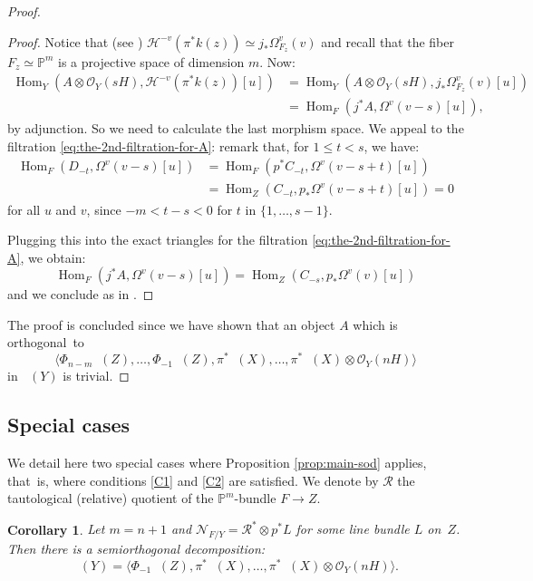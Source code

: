 \documentclass[JEP,XML,SOM,Unicode,NoEqCountersInSection]{cedram}
\let\mathcal\mathscr
\theoremstyle{plain}
\newtheorem{cor}[theorem]{Corollary}
\theoremstyle{definition}
\newcommand{\cat}[1]{\mathsf{#1}}
\newcommand{\sod}[1]{\langle #1 \rangle}
\DeclareMathOperator{\Db}{{\cat{D}^{\mathrm{b}}}}
\DeclareMathOperator{\Hom}{Hom}
\newcommand{\PP}{\mathbb{P}}
\newcommand{\sheaf}[1]{\mathcal{#1}}
\newcommand{\kh}{\sheaf{H}}
\newcommand{\kn}{\sheaf{N}}
\newcommand{\ko}{\sheaf{O}}\let\OO\ko\let\cO\ko
\newcommand{\kr}{\sheaf{R}}
\begin{document}
\begin{proof}
\begin{proof}
Notice that (see \eg \cite[Prop.\,11.12]{Huybook}) $\kh^{-v}( \pi^* k(z)) \simeq j_*\Omega_{F_z}^v(v)$ and recall that the fiber
$F_z \simeq \PP^m$ is a projective space of dimension $m$. Now:\vspace*{-3pt}
\begin{align*}
\Hom_Y(A \otimes \ko_Y(sH),\kh^{-v}( \pi^* k(z))[u]) & = \Hom_Y(A \otimes \ko_Y(sH),j_*\Omega_{F_z}^v(v)[u])\\
& = \Hom_F(j^* A, \Omega^v(v-s)[u]),
\end{align*}
by adjunction. So we need to calculate the last morphism space. We appeal to the filtration \eqref{eq:the-2nd-filtration-for-A}:
remark that, for $1 \leq t < s$, we have:\vspace*{-3pt}
\begin{align*}
\Hom_F(D_{-t}, \Omega^v(v-s)[u]) & = \Hom_F(p^* C_{-t}, \Omega^v(v-s+t)[u]) \\
& = \Hom_Z(C_{-t}, p_*\Omega^v(v-s+t)[u])=0
\end{align*}
for all $u$ and $v$, since $-m < t-s < 0$ for $t$ in $\{1,\ldots,s-1\}$.

Plugging this into the exact triangles for the filtration \eqref{eq:the-2nd-filtration-for-A}, we obtain:\vspace*{-3pt}
\[
\Hom_F(j^* A, \Omega^v(v-s)[u])= \Hom_Z(C_{-s},p_*\Omega^v(v)[u])
\]
and we conclude as in \cite[Prop.\,11.18]{Huybook}.
\end{proof}

The proof is concluded since we have shown that an object $A$ which is orthogonal~to\vspace*{-3pt}
\[
\sod{\Phi_{n-m}\Db(Z),\ldots,\Phi_{-1}\Db(Z),\pi^*\Db(X),\ldots,\pi^*\Db(X)\otimes \ko_Y(nH)}
\]
in $\Db(Y)$ is trivial.
\end{proof}

\subsection*{Special cases}

We detail here two special cases where Proposition \ref{prop:main-sod} applies, that~is,
where conditions \eqref{C1} and \eqref{C2} are satisfied. We denote by $\kr$ the tautological (relative)
quotient of the $\PP^m$-bundle $F \to Z$.

\begin{cor}\label{cor:ourcases}
Let $m=n+1$ and $\kn_{F/Y}=\kr^* \otimes p^* L$ for some line bundle $L$ on~$Z$. Then there is a
semiorthogonal decomposition:
\[
\Db(Y)=\sod{\Phi_{-1}\Db(Z),\pi^*\Db(X),\ldots,\pi^*\Db(X)\otimes \ko_Y(nH)}.
\]
\end{cor}
\end{document}
